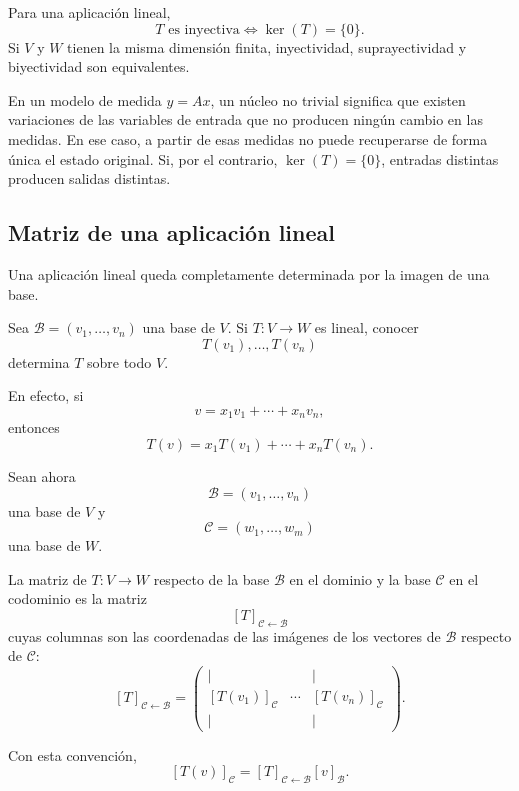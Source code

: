 Para una aplicación lineal,
\[
T\text{ es inyectiva}
\iff
\ker(T)=\{0\}.
\]
Si $V$ y $W$ tienen la misma dimensión finita, inyectividad, suprayectividad y biyectividad son equivalentes.

En un modelo de medida $y=Ax$, un núcleo no trivial significa que existen variaciones de las variables de entrada que no producen ningún cambio en las medidas. En ese caso, a partir de esas medidas no puede recuperarse de forma única el estado original. Si, por el contrario, $\ker(T)=\{0\}$, entradas distintas producen salidas distintas.

\subsection{Matriz de una aplicación lineal}

Una aplicación lineal queda completamente determinada por la imagen de una base.

\begin{theorem}
Sea $\mathcal B=(v_1,\ldots,v_n)$ una base de $V$. Si $T:V\to W$ es lineal, conocer
\[
T(v_1),\ldots,T(v_n)
\]
determina $T$ sobre todo $V$.
\end{theorem}

En efecto, si
\[
v=x_1v_1+\cdots+x_nv_n,
\]
entonces
\[
T(v)=x_1T(v_1)+\cdots+x_nT(v_n).
\]

Sean ahora
\[
\mathcal B=(v_1,\ldots,v_n)
\]
una base de $V$ y
\[
\mathcal C=(w_1,\ldots,w_m)
\]
una base de $W$.

\begin{definition}
La matriz de $T:V\to W$ respecto de la base $\mathcal B$ en el dominio y la base $\mathcal C$ en el codominio es la matriz
\[
[T]_{\mathcal C\leftarrow\mathcal B}
\]
cuyas columnas son las coordenadas de las imágenes de los vectores de $\mathcal B$ respecto de $\mathcal C$:
\[
[T]_{\mathcal C\leftarrow\mathcal B}
=
\begin{pmatrix}
|&&|\\
[T(v_1)]_{\mathcal C}&\cdots&[T(v_n)]_{\mathcal C}\\
|&&|
\end{pmatrix}.
\]
\end{definition}

Con esta convención,
\[
\boxed{
[T(v)]_{\mathcal C}
=
[T]_{\mathcal C\leftarrow\mathcal B}
[v]_{\mathcal B}.
}
\]

